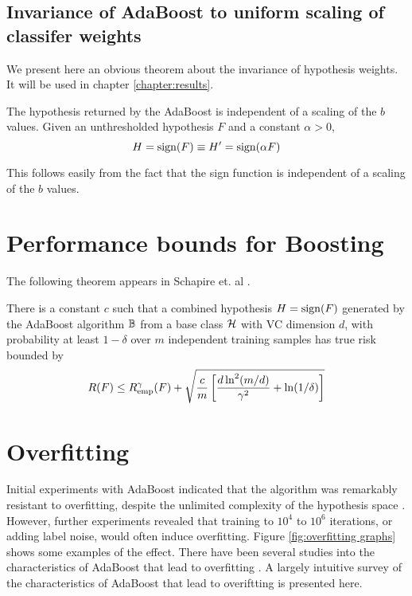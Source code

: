 \subsection{Invariance of AdaBoost to uniform scaling of classifer
weights}

We present here an obvious theorem about the invariance of hypothesis
weights.  It will be used in chapter \ref{chapter:results}.

\begin{theorem}
The hypothesis returned by the AdaBoost is independent of a 
scaling of the $b$ values.  Given an unthresholded hypothesis $F$ and
a constant $\alpha > 0$,
%
\begin{equation}
H = \mathrm{sign}(F) \equiv H' = \mathrm{sign}(\alpha F) 
\end{equation}
\end{theorem}

\proof This follows easily from the fact that the sign function is
independent of a scaling of the $b$ values.



\section{Performance bounds for Boosting}

The following theorem appears in Schapire et. al \cite{Schapire97}.

\begin{theorem}[Performance bound for boosting ($p$=1)]

There is a constant $c$ such that a combined hypothesis $H = \mathrm{sign}(F)$
generated by the AdaBoost algorithm $\mathbb{B}$ from a base class $\mathcal{H}$
with VC dimension $d$, with probability at least $1 - \delta$ over $m$
independent training samples has true risk bounded by 
\begin{equation}
R(F) \leq R_{\mathrm{emp}}^{\gamma}(F) + \sqrt{\frac{c}{m} \left[ \frac{d
\ln^2 (m/d)}{\gamma^2} + \ln(1/\delta) \right] }
\end{equation}
\end{theorem}


\section{Overfitting}
\label{sec:boost overfitting}

Initial experiments with AdaBoost indicated that the algorithm was
remarkably resistant to overfitting, despite the unlimited complexity
of the hypothesis space \cite{Freund96}.
However, further experiments \cite{Grove98, Bauer99} revealed that
training to $10^4$ to $10^6$ iterations, or adding label noise, would
often induce overfitting.  Figure \ref{fig:overfitting graphs} shows some
examples of the effect.  There have been several studies into the
characteristics of AdaBoost that lead to overfitting \cite{Schapire97,
Grove98, Ratsch98}.  A largely intuitive survey of the characteristics
of AdaBoost that lead to overiftting is presented here. 


